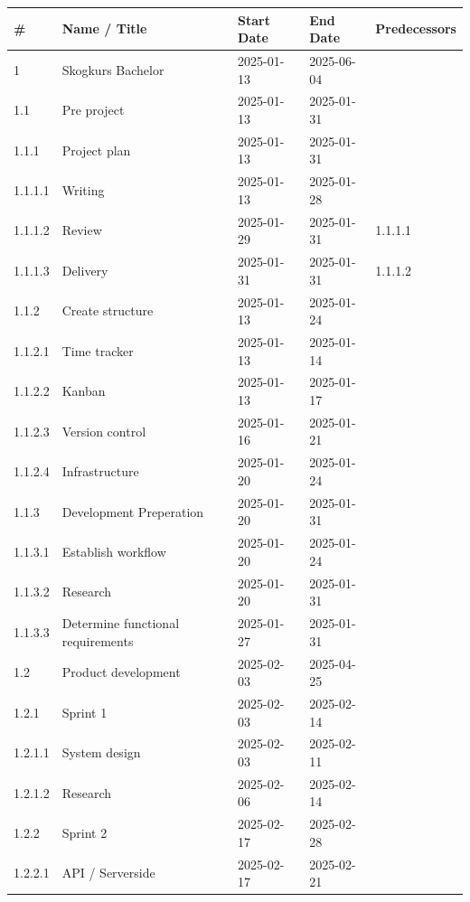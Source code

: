 \begin{table}[H]
    \centering
    \begin{tabular}{|l|l|l|l|l|}
    \hline
        \# & Name / Title & Start Date & End Date & Predecessors \\ \hline
        1 & Skogkurs Bachelor & 2025-01-13 & 2025-06-04 & ~ \\ \hline
        1.1 & Pre project & 2025-01-13 & 2025-01-31 & ~ \\ \hline
        1.1.1 & Project plan & 2025-01-13 & 2025-01-31 & ~ \\ \hline
        1.1.1.1 & Writing & 2025-01-13 & 2025-01-28 & ~ \\ \hline
        1.1.1.2 & Review & 2025-01-29 & 2025-01-31 & 1.1.1.1 \\ \hline
        1.1.1.3 & Delivery & 2025-01-31 & 2025-01-31 & 1.1.1.2 \\ \hline
        1.1.2 & Create structure & 2025-01-13 & 2025-01-24 & ~ \\ \hline
        1.1.2.1 & Time tracker & 2025-01-13 & 2025-01-14 & ~ \\ \hline
        1.1.2.2 & Kanban & 2025-01-13 & 2025-01-17 & ~ \\ \hline
        1.1.2.3 & Version control & 2025-01-16 & 2025-01-21 & ~ \\ \hline
        1.1.2.4 & Infrastructure & 2025-01-20 & 2025-01-24 & ~ \\ \hline
        1.1.3 & Development Preperation & 2025-01-20 & 2025-01-31 & ~ \\ \hline
        1.1.3.1 & Establish workflow & 2025-01-20 & 2025-01-24 & ~ \\ \hline
        1.1.3.2 & Research & 2025-01-20 & 2025-01-31 & ~ \\ \hline
        1.1.3.3 & Determine functional requirements & 2025-01-27 & 2025-01-31 & ~ \\ \hline
        1.2 & Product development & 2025-02-03 & 2025-04-25 & ~ \\ \hline
        1.2.1 & Sprint 1 & 2025-02-03 & 2025-02-14 & ~ \\ \hline
        1.2.1.1 & System design & 2025-02-03 & 2025-02-11 & ~ \\ \hline
        1.2.1.2 & Research & 2025-02-06 & 2025-02-14 & ~ \\ \hline
        1.2.2 & Sprint 2 & 2025-02-17 & 2025-02-28 & ~ \\ \hline
        1.2.2.1 & API / Serverside & 2025-02-17 & 2025-02-21 & ~ \\ \hline

\end{tabular}
\end{table}
